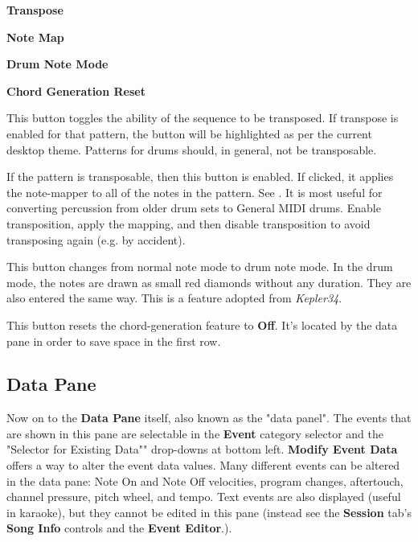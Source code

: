 \begin{itemize}
   \begin{enumber}
      \item \textbf{Transpose}
      \item \textbf{Note Map}
      \item \textbf{Drum Note Mode}
      \item \textbf{Chord Generation Reset}
   \end{enumber}

   \setcounter{ItemCounter}{0}      %

   This button toggles the ability of the sequence to be transposed.
   If transpose is enabled for that pattern, the button will be highlighted as
   per the current desktop theme.  Patterns for drums should, in general, not
   be transposable.

   If the pattern is transposable, then this button is enabled.
   If clicked, it applies the note-mapper to all of the notes in the pattern.
   See .
   It is most useful for converting percussion from older drum sets to
   General MIDI drums.  Enable transposition, apply the mapping, and then
   disable transposition to avoid transposing again (e.g. by accident).

   This button changes from normal note mode to drum note mode. In the drum
   mode, the notes are drawn as small red diamonds without any duration.
   They are also entered the same way.
   This is a feature adopted from \textsl{Kepler34}.

   This button resets the chord-generation feature to \textbf{Off}.
   It's located by the data pane in order to save space in the first row.

\subsection{Data Pane}
\label{subsec:pattern_editor_data_view}

   Now on to the \textbf{Data Pane} itself, also known as the "data panel".
   The events that are shown in this pane
   are selectable in the \textbf{Event} category
   selector and the "Selector for Existing Data"" drop-downs at bottom left.
   \textbf{Modify Event Data} offers a way to
   alter the event data values.
   Many different events can be altered in the data pane:
   Note On and Note Off velocities, program changes, aftertouch, channel
   pressure, pitch wheel, and tempo.
   Text events are also displayed (useful in karaoke), but they cannot be
   edited in this pane
   (instead see the \textbf{Session} tab's \textbf{Song Info} controls and
   the \textbf{Event Editor}.).


\end{itemize}
